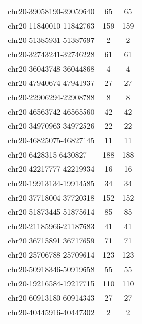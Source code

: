\begin{longtable}{lSS}
	chr20-39058190-39059640 & 65     & 65                                        \\
	chr20-11840010-11842763 & 159    & 159                                       \\
	chr20-51385931-51387697 & 2      & 2                                         \\
	chr20-32743241-32746228 & 61     & 61                                        \\
	chr20-36043748-36044868 & 4      & 4                                         \\
	chr20-47940674-47941937 & 27     & 27                                        \\
	chr20-22906294-22908788 & 8      & 8                                         \\
	chr20-46563742-46565560 & 42     & 42                                        \\
	chr20-34970963-34972526 & 22     & 22                                        \\
	chr20-46825075-46827145 & 11     & 11                                        \\
	chr20-6428315-6430827   & 188    & 188                                       \\
	chr20-42217777-42219934 & 16     & 16                                        \\
	chr20-19913134-19914585 & 34     & 34                                        \\
	chr20-37718004-37720318 & 152    & 152                                       \\
	chr20-51873445-51875614 & 85     & 85                                        \\
	chr20-21185966-21187683 & 41     & 41                                        \\
	chr20-36715891-36717659 & 71     & 71                                        \\
	chr20-25706788-25709614 & 123    & 123                                       \\
	chr20-50918346-50919658 & 55     & 55                                        \\
	chr20-19216584-19217715 & 110    & 110                                       \\
	chr20-60913180-60914343 & 27     & 27                                        \\
	chr20-40445916-40447302 & 2      & 2                                         \\

\end{longtable}
